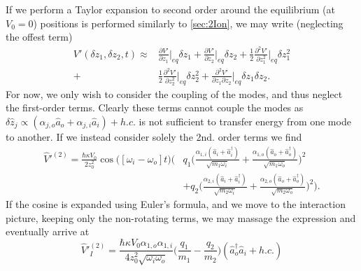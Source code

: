 If we perform a Taylor expansion to second order around the equilibrium (at $V_0= 0$) positions is performed similarly to \cref{sec:2Ion}, we may write (neglecting the offest term)
\begin{align}
    V'(\delta z_1,\delta z_2,t)\approx &\frac{\partial V'}{\partial z_1}\bigg\vert_{eq}\delta z_1+\frac{\partial V'}{\partial z_2}\bigg\vert_{eq}\delta z_2
    +\frac{1}{2}\frac{\partial^2 V'}{\partial z_1^2}\bigg\vert_{eq}\delta z_1^2\nonumber\\+&\frac{1}{2}\frac{\partial^2 V'}{\partial z_2^2}\bigg\vert_{eq}\delta z_2^2
    +\frac{\partial^2 V'}{\partial z_1\partial z_2}\bigg\vert_{eq}\delta z_1\delta z_2.
\end{align}
For now, we only wish to consider the coupling of the modes, and thus neglect the first-order terms. Clearly these terms cannot couple the modes as $\delta\hat{z}_j\propto (\alpha_{j,o}\hat{a}_o+\alpha_{j,i}\hat{a}_i)+h.c.$ is not sufficient to transfer energy from one mode to another. If we instead consider solely the 2nd. order terms we find
\begin{align}
    \hat{V}'^{(2)} = \nonumber \frac{\hbar\kappa V_0}{2z_0^2}\cos{\big([\omega_i-\omega_o]t\big)}\bigg(&q_1\big(\frac{\alpha_{1,i}(\hat{a}_i+\hat{a}_i^\dagger)}{\sqrt{m_1\omega_i}}+\frac{\alpha_{1,o}(\hat{a}_o+\hat{a}_o^\dagger)}{\sqrt{m_1\omega_o}}\big)^2\\
    &+q_2\big(\frac{\alpha_{2,i}(\hat{a}_i+\hat{a}_i^\dagger)}{\sqrt{m_2\omega_i}}+\frac{\alpha_{2,o}(\hat{a}_o+\hat{a}_o^\dagger)}{\sqrt{m_2\omega_o}}\big)^2\bigg).
\end{align}
If the cosine is expanded using Euler's formula, and we move to the interaction picture, keeping only the non-rotating terms, we may massage the expression and eventually arrive at
\begin{equation}
    \hat{V}'^{(2)}_I = \frac{\hbar\kappa V_0\alpha_{1,o}\alpha_{1,i}}{4z_0^2\sqrt{\omega_i\omega_o}}\big(\frac{q_1}{m_1}-\frac{q_2}{m_2}\big)(\hat{a}_o^\dagger \hat{a}_i + h.c.)
\end{equation}
